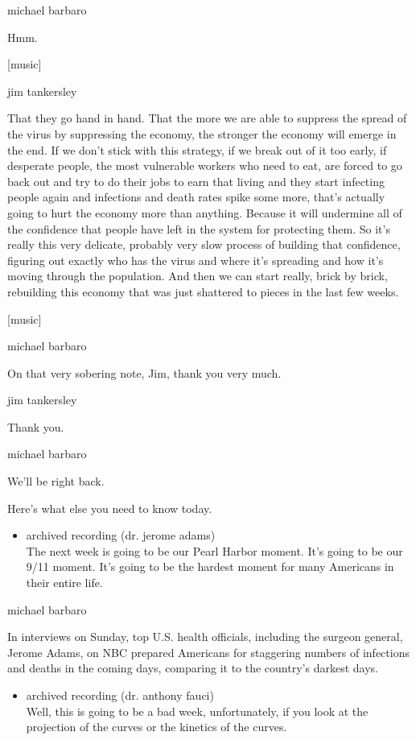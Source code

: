 michael barbaro

Hmm.

{[}music{]}

jim tankersley

That they go hand in hand. That the more we are able to suppress the
spread of the virus by suppressing the economy, the stronger the economy
will emerge in the end. If we don't stick with this strategy, if we
break out of it too early, if desperate people, the most vulnerable
workers who need to eat, are forced to go back out and try to do their
jobs to earn that living and they start infecting people again and
infections and death rates spike some more, that's actually going to
hurt the economy more than anything. Because it will undermine all of
the confidence that people have left in the system for protecting them.
So it's really this very delicate, probably very slow process of
building that confidence, figuring out exactly who has the virus and
where it's spreading and how it's moving through the population. And
then we can start really, brick by brick, rebuilding this economy that
was just shattered to pieces in the last few weeks.

{[}music{]}

michael barbaro

On that very sobering note, Jim, thank you very much.

jim tankersley

Thank you.

michael barbaro

We'll be right back.

Here's what else you need to know today.

\begin{itemize}
\tightlist
\item
  archived recording (dr. jerome adams)\\
  The next week is going to be our Pearl Harbor moment. It's going to be
  our 9/11 moment. It's going to be the hardest moment for many
  Americans in their entire life.
\end{itemize}

michael barbaro

In interviews on Sunday, top U.S. health officials, including the
surgeon general, Jerome Adams, on NBC prepared Americans for staggering
numbers of infections and deaths in the coming days, comparing it to the
country's darkest days.

\begin{itemize}
\tightlist
\item
  archived recording (dr. anthony fauci)\\
  Well, this is going to be a bad week, unfortunately, if you look at
  the projection of the curves or the kinetics of the curves.
\end{itemize}

